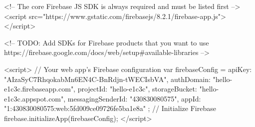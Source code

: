 <!-- The core Firebase JS SDK is always required and must be listed first -->
<script src="https://www.gstatic.com/firebasejs/8.2.1/firebase-app.js"></script>

<!-- TODO: Add SDKs for Firebase products that you want to use
     https://firebase.google.com/docs/web/setup#available-libraries -->

<script>
  // Your web app's Firebase configuration
  var firebaseConfig = {
    apiKey: "AIzaSyC7RhqokabMn6EN4C-BnRdjn-tWECIsbVA",
    authDomain: "hello-e1c3c.firebaseapp.com",
    projectId: "hello-e1c3c",
    storageBucket: "hello-e1c3c.appspot.com",
    messagingSenderId: "430830080575",
    appId: "1:430830080575:web:5fd009ce09726fe5ba1e8a"
  };
  // Initialize Firebase
  firebase.initializeApp(firebaseConfig);
</script>

